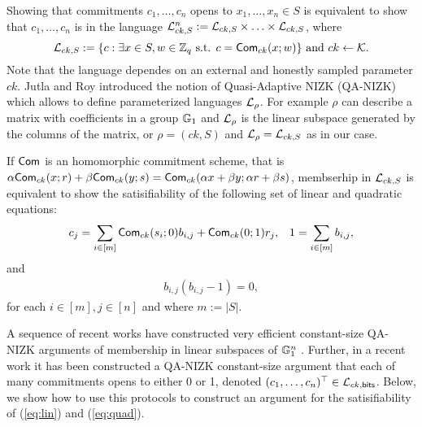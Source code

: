 Showing that commitments $c_1,\ldots,c_n$ opens to $x_1,\ldots,x_n\in S$ is equivalent to show that $c_1,\ldots,c_n$ is in the language $\mathcal{L}_{ck,S}^n:=\mathcal{L}_{ck,S}\times\ldots\times\mathcal{L}_{ck,S}$, where
$$
\mathcal{L}_{ck,S}:=\{c:\exists x\in S, w\in\mathbb{Z}_q \text{ s.t. } c=\mathsf{Com}_{ck}(x;w)\}\text{ and }ck\gets\mathcal{K}.
$$
Note that the language dependes on an external and honestly sampled parameter $ck$. Jutla and Roy introduced the notion of Quasi-Adaptive NIZK (QA-NIZK) \cite{AC:JutRoy13} which allows to define parameterized languages $\mathcal{L}_{\rho}$. For example $\rho$ can describe a matrix with coefficients in a group $\mathbb{G}_1$ and $\mathcal{L}_{\rho}$ is the linear subspace generated by the columns of the matrix, or $\rho=(ck,S)$ and $\mathcal{L}_{\rho}=\mathcal{L}_{ck,S}$ as in our case.

If $\mathsf{Com}$ is an homomorphic commitment scheme, that is $\alpha\mathsf{Com}_{ck}(x;r)+\beta\mathsf{Com}_{ck}(y;s)=\mathsf{Com}_{ck}(\alpha x+\beta y;\alpha r + \beta s)$,  membserhip in $\mathcal{L}_{ck,S}$ is equivalent to show the satisifiability of the following set of linear and quadratic equations:
\begin{align}
c_j = \sum_{i\in[m]}\mathsf{Com}_{ck}(s_i;0)b_{i,j}+\mathsf{Com}_{ck}(0;1)r_j,&
& 1= \sum_{i\in[m]}b_{i,j},      \label{eq:lin}
\end{align}
and
\begin{align}
b_{i,j}(b_{i,j}-1)=0 \label{eq:quad},
\end{align}
for each $i\in[m],j\in[n]$ and where $m:=|S|$.

A sequence of recent works have constructed very efficient constant-size QA-NIZK arguments of membership in linear subspaces of $\mathbb{G}_1^n$ \cite{EC:LPJY14,C:JutRoy14,EC:AbdBenPoi15,EC:KilWee15}.
Further, in a recent work \cite{AC:GonHevRaf15} it has been constructed a QA-NIZK constant-size argument that each of many commitments opens to either 0 or 1, denoted $(c_1,\ldots,c_n)^\top\in\mathcal{L}_{ck,\mathsf{bits}}$. Below, we show how to use this protocols to construct an argument for the satisifiability of (\ref{eq:lin}) and (\ref{eq:quad}).

